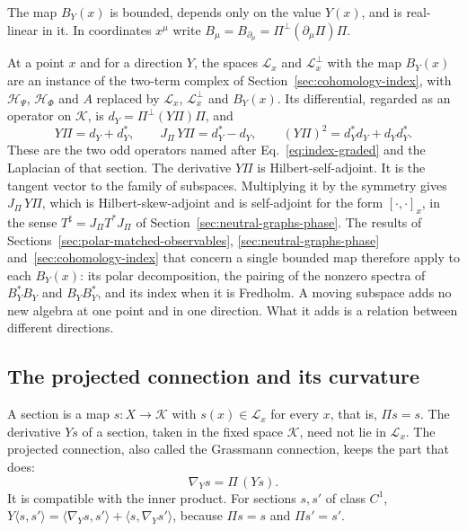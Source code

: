 The map $B_Y(x)$ is bounded, depends only on the value $Y(x)$, and is real-linear in it. In coordinates $x^\mu$ write $B_\mu=B_{\partial_\mu}=\Pi^\perp(\partial_\mu\Pi)\Pi$.

At a point $x$ and for a direction $Y$, the spaces $\mathcal L_x$ and $\mathcal L_x^\perp$ with the map $B_Y(x)$ are an instance of the two-term complex of Section~\ref{sec:cohomology-index}, with $\mathcal H_\Psi$, $\mathcal H_\Phi$ and $A$ replaced by $\mathcal L_x$, $\mathcal L_x^\perp$ and $B_Y(x)$. Its differential, regarded as an operator on $\mathcal K$, is $d_Y=\Pi^\perp(Y\Pi)\Pi$, and
\begin{equation}
 Y\Pi=d_Y+d_Y^*,\qquad J_\Pi\,Y\Pi=d_Y^*-d_Y,\qquad (Y\Pi)^2=d_Y^*d_Y+d_Yd_Y^* .
 \label{eq:moving-two-odd}
\end{equation}
These are the two odd operators named after Eq.~\eqref{eq:index-graded} and the Laplacian of that section. The derivative $Y\Pi$ is Hilbert-self-adjoint. It is the tangent vector to the family of subspaces. Multiplying it by the symmetry gives $J_\Pi\,Y\Pi$, which is Hilbert-skew-adjoint and is self-adjoint for the form $[\cdot,\cdot]_x$, in the sense $T^\sharp=J_\Pi T^*J_\Pi$ of Section~\ref{sec:neutral-graphs-phase}. The results of Sections~\ref{sec:polar-matched-observables}, \ref{sec:neutral-graphs-phase} and~\ref{sec:cohomology-index} that concern a single bounded map therefore apply to each $B_Y(x)$: its polar decomposition, the pairing of the nonzero spectra of $B_Y^*B_Y$ and $B_YB_Y^*$, and its index when it is Fredholm. A moving subspace adds no new algebra at one point and in one direction. What it adds is a relation between different directions.

\subsection{The projected connection and its curvature}
\label{subsec:moving-connection}

A section is a map $s:X\to\mathcal K$ with $s(x)\in\mathcal L_x$ for every $x$, that is, $\Pi s=s$. The derivative $Ys$ of a section, taken in the fixed space $\mathcal K$, need not lie in $\mathcal L_x$. The projected connection, also called the Grassmann connection, keeps the part that does:
\begin{equation}
 \nabla_Ys=\Pi\,(Ys).
 \label{eq:moving-connection}
\end{equation}
It is compatible with the inner product. For sections $s,s'$ of class $C^1$, $Y\langle s,s'\rangle=\langle\nabla_Ys,s'\rangle+\langle s,\nabla_Ys'\rangle$, because $\Pi s=s$ and $\Pi s'=s'$.

